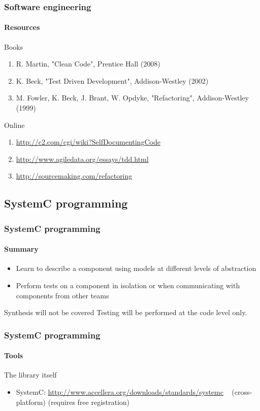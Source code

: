 \begin{frame}
\frametitle{Software engineering}
\framesubtitle{Resources}
\begin{block}{Books}
\begin{enumerate}
\item R. Martin, "Clean Code", Prentice Hall (2008)
\item K. Beck, "Test Driven Development", Addison-Westley (2002)
\item M. Fowler, K. Beck, J. Brant, W. Opdyke, "Refactoring", Addison-Westley (1999)
\end{enumerate}
\end{block}

\begin{block}{Online}
\begin{enumerate}
\item \url{http://c2.com/cgi/wiki?SelfDocumentingCode}
\item \url{http://www.agiledata.org/essays/tdd.html}
\item \url{http://sourcemaking.com/refactoring}
\end{enumerate}
\end{block}

\end{frame}

\subsection{SystemC programming}

\begin{frame}
\frametitle{SystemC programming}
\framesubtitle{Summary}

\begin{itemize}
\item Learn to describe a component using models at different levels of abstraction
\item Perform tests on a component in isolation or when communicating with components from other teams
\end{itemize}

\pause
\begin{block}{Synthesis will not be covered}
Testing will be performed at the code level only.
\end{block}
\end{frame}

\begin{frame}
\frametitle{SystemC programming}
\framesubtitle{Tools}

\begin{block}{The library itself}
\begin{itemize}
\item SystemC: \url{http://www.accellera.org/downloads/standards/systemc} \,\,\, (cross-platform) (requires free registration)
\end{itemize}
\end{block}

\end{frame}

